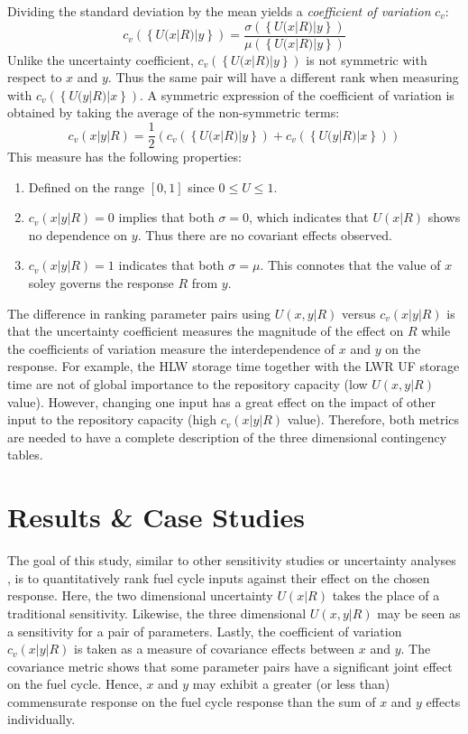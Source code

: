 \documentclass[preprint,12pt]{elsarticle}
\begin{document}
Dividing the standard deviation by the mean yields a \emph{coefficient of variation} $c_v$:
\begin{equation} c_v(\left\{U(x|R)|y\right\}) = \frac{\sigma(\left\{U(x|R)|y\right\})}{\mu(\left\{U(x|R)|y\right\})} \end{equation}
Unlike the uncertainty coefficient, $c_v(\left\{U(x|R)|y\right\})$ is not symmetric with respect to $x$ and $y$.  
Thus the same pair will have a different rank when measuring
with $c_v(\left\{U(y|R)|x\right\})$.  A symmetric expression of the coefficient of variation is obtained by taking 
the average of the non-symmetric terms:
\begin{equation} c_v(x|y|R) = \frac{1}{2} \left(c_v(\left\{U(x|R)|y\right\}) + c_v(\left\{U(y|R)|x\right\})\right) \end{equation}
This measure has the following properties:
\begin{enumerate}
    \item Defined on the range $[0, 1]$ since $0 \le U \le 1$.
    \item $c_v(x|y|R) = 0$ implies that both $\sigma = 0$, which indicates that $U(x|R)$
        shows no dependence on $y$.  Thus there are no covariant effects observed.
    \item $c_v(x|y|R) = 1$ indicates that both $\sigma = \mu$.  This connotes
        that the value of $x$ soley governs the response $R$ from $y$.
\end{enumerate}

The difference in ranking parameter pairs using $U(x,y|R)$ versus $c_v(x|y|R)$ is that the uncertainty 
coefficient measures the magnitude
of the effect on $R$ while the coefficients of variation measure the interdependence of $x$ and $y$ on 
the response.
For example, the HLW storage time together with the LWR UF storage time are not of global importance to 
the repository capacity (low $U(x,y|R)$ value).
However, changing one input has a great effect on the impact of other input to the repository capacity 
(high $c_v(x|y|R)$ value).
Therefore, both metrics are needed to have a complete description of the three dimensional contingency tables.



\section{Results \& Case Studies}
\label{sec:results}

The goal of this study, similar to other sensitivity studies \cite{Scopatz2010b} or uncertainty 
analyses \cite{Barratt2004}, is to quantitatively rank fuel cycle inputs against their effect on 
the chosen response.  Here, the two dimensional uncertainty $U(x|R)$ takes the place of a 
traditional sensitivity.  Likewise, the three dimensional $U(x,y|R)$ may be seen as a sensitivity 
for a pair of parameters.  Lastly, the coefficient of variation $c_v(x|y|R)$ is taken as a 
measure of covariance effects between $x$ and $y$.  The covariance metric shows that some parameter 
pairs have a significant joint effect on the fuel cycle. Hence, $x$ and $y$ may exhibit a greater 
(or less than) commensurate response on the fuel cycle response than the sum of $x$ and $y$ effects individually.
\end{document}
